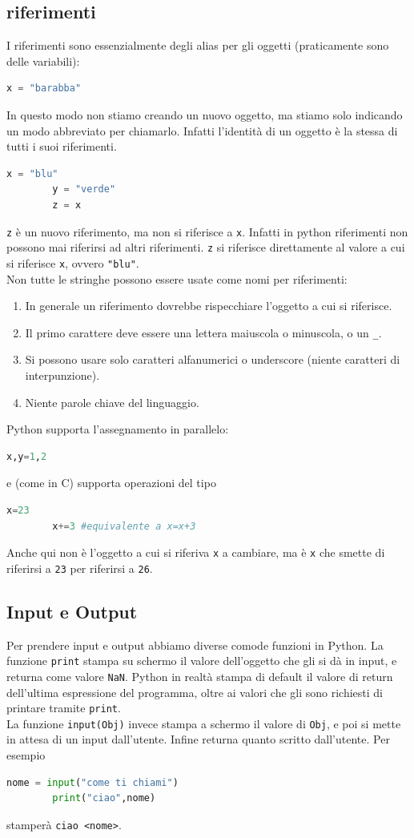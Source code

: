 \documentclass[11pt]{scrartcl}
\begin{document}
	\subsection{riferimenti}
	I riferimenti sono essenzialmente degli alias per gli oggetti (praticamente sono delle variabili):
	\begin{lstlisting}[language=Python]
		x = "barabba"
	\end{lstlisting}
	In questo modo non stiamo creando un nuovo oggetto, ma stiamo solo indicando un modo abbreviato per chiamarlo. Infatti l'identità di un oggetto è la stessa di tutti i suoi riferimenti.
	\begin{lstlisting}[language=Python]
		x = "blu"
		y = "verde"
		z = x
	\end{lstlisting}
	\verb*|z| è un nuovo riferimento, ma non si riferisce a \verb*|x|. Infatti in python riferimenti non possono mai riferirsi ad altri riferimenti. \verb*|z| si riferisce direttamente al valore a cui si riferisce \verb*|x|, ovvero \verb*|"blu"|.\\
	Non tutte le stringhe possono essere usate come nomi per riferimenti:
	\begin{enumerate}
		\item[0.] In generale un riferimento dovrebbe rispecchiare l'oggetto a cui si riferisce.
		\item Il primo carattere deve essere una lettera maiuscola o minuscola, o un \verb*|_|. 
		\item Si possono usare solo caratteri alfanumerici o underscore (niente caratteri di interpunzione).
		\item Niente parole chiave del linguaggio.
	\end{enumerate}
	Python supporta l'assegnamento in parallelo:
	\begin{lstlisting}[language=Python]
		x,y=1,2
	\end{lstlisting}
	e (come in C) supporta operazioni del tipo
	\begin{lstlisting}[language=Python]
		x=23
		x+=3 #equivalente a x=x+3
	\end{lstlisting}
	Anche qui non è l'oggetto a cui si riferiva \verb*|x| a cambiare, ma è \verb*|x| che smette di riferirsi a \verb*|23| per riferirsi a \verb*|26|.
	\subsection{Input e Output}
	Per prendere input e output abbiamo diverse comode funzioni in Python. La funzione \verb*|print| stampa su schermo il valore dell'oggetto che gli si dà in input, e returna come valore \verb*|NaN|. Python in realtà stampa di default il valore di return dell'ultima espressione del programma, oltre ai valori che gli sono richiesti di printare tramite \verb*|print|. \\
	La funzione \verb*|input(Obj)| invece stampa a schermo il valore di \verb*|Obj|, e poi si mette in attesa di un input dall'utente. Infine returna quanto scritto dall'utente. Per esempio
	\begin{lstlisting}[language=Python]
		nome = input("come ti chiami")
		print("ciao",nome)
	\end{lstlisting}
	stamperà \verb|ciao <nome>|. 
\end{document}
